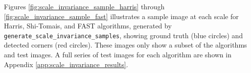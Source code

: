 \documentclass[journal]{IEEEtran}
\begin{document}
Figures \ref{fig:scale_invariance_sample_harris} through \ref{fig:scale_invariance_sample_fast} illustrates a sample image at each scale for Harris, Shi-Tomais, and FAST algorithms, generated by \texttt{generate\_scale\_invariance\_samples}, showing ground truth (blue circles) and detected corners (red circles). These images only show a subset of the algorithms and test images. A full series of test images for each algorithm are shown in Appendix \ref{app:scale_invariance_results}. \\

\begin{table}[t]
    \centering
\end{table}
\end{document}
